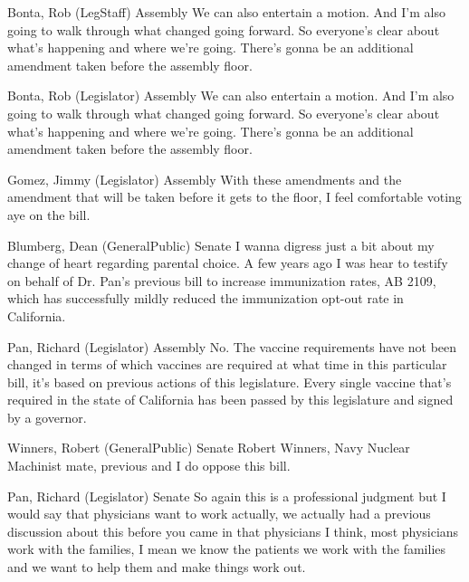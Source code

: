 \begin{result}{11.467769906103975}{Bonta, Rob (LegStaff) Assembly}
We can also entertain a motion. And I'm also going to walk through what changed going forward. So everyone's clear about what's happening and where we're going. There's gonna be an additional amendment taken before the assembly floor.
\end{result}

\begin{result}{11.467769906103975}{Bonta, Rob (Legislator) Assembly}
We can also entertain a motion. And I'm also going to walk through what changed going forward. So everyone's clear about what's happening and where we're going. There's gonna be an additional amendment taken before the assembly floor.
\end{result}

\begin{result}{9.968776745039438}{Gomez, Jimmy (Legislator) Assembly}
With these amendments and the amendment that will be taken before it gets to the floor, I feel comfortable voting aye on the bill.
\end{result}

\begin{result}{9.358442067508566}{Blumberg, Dean (GeneralPublic) Senate}
I wanna digress just a bit about my change of heart regarding parental choice. A few years ago I was hear to testify on behalf of Dr. Pan's previous bill to increase immunization rates, AB 2109, which has successfully mildly reduced the immunization opt-out rate in California.
\end{result}

\begin{result}{8.91434106058687}{Pan, Richard (Legislator) Assembly}
No. The vaccine requirements have not been changed in terms of which vaccines are required at what time in this particular bill, it's based on previous actions of this legislature. Every single vaccine that's required in the state of California has been passed by this legislature and signed by a governor.
\end{result}

\begin{result}{7.937499437047336}{Winners, Robert (GeneralPublic) Senate}
Robert Winners, Navy Nuclear Machinist mate, previous and I do oppose this bill.
\end{result}

\begin{result}{7.848895309967175}{Pan, Richard (Legislator) Senate}
So again this is a professional judgment but I would say that physicians want to work actually, we actually had a previous discussion about this before you came in that physicians I think, most physicians work with the families, I mean we know the patients we work with the families and we want to help them and make things work out.
\end{result}

